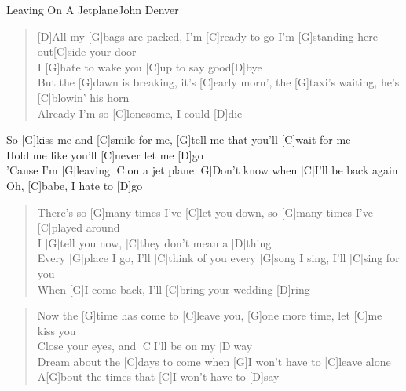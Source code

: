\begin{song}{Leaving On A Jetplane}{John Denver}

    \begin{verse}  
        [D]All my [G]bags are packed, I'm [C]ready to go I'm [G]standing here out[C]side your door \\
        I [G]hate to wake you [C]up to say good[D]bye \\
        But the [G]dawn is breaking, it's [C]early morn', the [G]taxi's waiting, he's [C]blowin' his horn \\
        [G]Already I'm so [C]lonesome, I could [D]die
    \end{verse}  

    \begin{chorus}
        So [G]kiss me and [C]smile for me, [G]tell me that you'll [C]wait for me \\
        [G]Hold me like you'll [C]never let me [D]go \\
        'Cause I'm [G]leaving [C]on a jet plane [G]Don't know when [C]I'll be back again \\
        [G] Oh, [C]babe, I hate to [D]go
    \end{chorus}

    \begin{verse}  
        There's so [G]many times I've [C]let you down, so [G]many times I've [C]played around \\
        I [G]tell you now, [C]they don't mean a [D]thing \\
        Every [G]place I go, I'll [C]think of you every [G]song I sing, I'll [C]sing for you \\
        When [G]I come back, I'll [C]bring your wedding [D]ring
    \end{verse}  


    \begin{verse}  
        Now the [G]time has come to [C]leave you, [G]one more time, let [C]me kiss you \\
        [G]Close your eyes, and [C]I'll be on my [D]way \\
        [G]Dream about the [C]days to come when [G]I won't have to [C]leave alone \\
        A[G]bout the times that [C]I won't have to [D]say
    \end{verse}  


\end{song}
